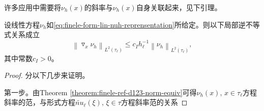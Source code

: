 许多应用中需要将$\nu_{h}(x)$的斜率与$\nu_{h}(x)$自身关联起来，见下引理。
\begin{lemma}[方程范数与方程斜率的范数]
  \label{lemma:fenele-form-norm-gradient}
  设线性方程$\nu_{h}$如\eqref{eq:finele-form-lin-nuh-reprensentation}所给定。则以下局部逆不等式关系成立
  \begin{equation}
    \label{eq:fenele-form-norm-gradient}
    \left\| \triangledown_{x} \nu_{h} \right\|_{L^{2}(\tau_{\ell})}
    \le c_{I} h_{\ell}^{-1} \left\| \nu_{h} \right\|_{L^{2}(\tau_{\ell})},
  \end{equation}
  其中常数$c_{I} > 0$。
\end{lemma}
\begin{proof}
  分以下几步来证明。

  第一步。由Theorem \ref{theorem:finele-ref-d123-norm-equiv}可得$\nu_{h}(x), \, x \in \tau_{\ell}$方程斜率的范，与形式方程$\widetilde{nu}_{\ell} (\xi), \, \xi \in \tau$方程斜率范的关系

\end{proof}
